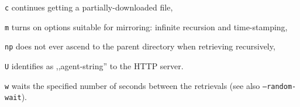 \begin{enumx}
\item [\texttt{c}] continues getting a partially-downloaded file,
\item [\texttt{m}] turns on options suitable for mirroring: 
	infinite recursion and time-stamping,
\item [\texttt{np}] does not ever ascend to the
	parent directory when retrieving recursively,
\item [\texttt{U}] identifies as ,,agent-string'' to the HTTP server.
\item [\texttt{w}] waits the specified number of seconds 
	between the retrievals (see also \texttt{--random-wait}).
\end{enumx}
